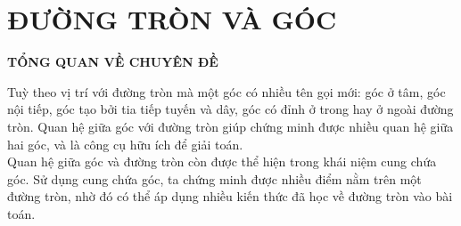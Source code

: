 \section{ĐƯỜNG TRÒN VÀ GÓC}

\begin{center}
 \large \textbf{TỔNG QUAN VỀ CHUYÊN ĐỀ}
\end{center}
Tuỳ theo vị trí với đường tròn mà một góc có nhiều tên gọi mới: góc ở tâm, góc nội tiếp, góc tạo bởi tia tiếp tuyến và dây, góc có đỉnh ở trong hay ở ngoài đường tròn. Quan hệ giữa góc với đường tròn giúp chứng minh được nhiều quan hệ giữa hai góc, và là công cụ hữu ích để giải toán.\\
Quan hệ giữa góc và đường tròn còn được thể hiện trong khái niệm cung chứa góc. Sử dụng cung chứa góc, ta chứng minh được nhiều điểm nằm trên một đường tròn, nhờ đó có thể áp dụng nhiều kiến thức đã học về đường tròn vào bài toán.



